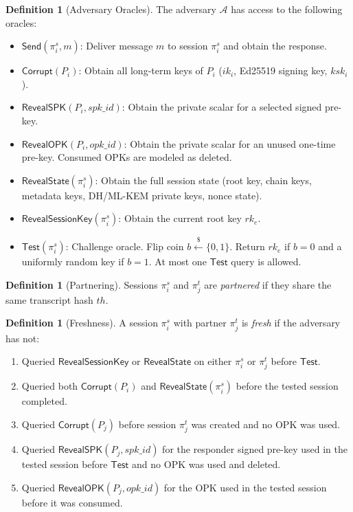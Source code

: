 \documentclass[preprint,12pt]{elsarticle}
\theoremstyle{definition}
\newtheorem{definition}[theorem]{Definition}
\newcommand{\advA}{\mathcal{A}}
\newcommand{\getsr}{\stackrel{\$}{\gets}}
\newcommand{\rk}{\mathit{rk}}
\begin{document}
\begin{definition}[Adversary Oracles]\label{def:oracles}
The adversary $\advA$ has access to the following oracles:
\begin{itemize}
  \item $\textsf{Send}(\pi_i^s, m)$: Deliver message $m$ to session $\pi_i^s$ and obtain the response.
  \item $\textsf{Corrupt}(P_i)$: Obtain all long-term keys of $P_i$ ($\mathit{ik}_i$, Ed25519 signing key, $ksk_i$).
  \item $\textsf{RevealSPK}(P_i,\mathit{spk\_id})$: Obtain the private scalar for a selected signed pre-key.
  \item $\textsf{RevealOPK}(P_i,\mathit{opk\_id})$: Obtain the private scalar for an unused one-time pre-key. Consumed OPKs are modeled as deleted.
  \item $\textsf{RevealState}(\pi_i^s)$: Obtain the full session state (root key, chain keys, metadata keys, DH/ML-KEM private keys, nonce state).
  \item $\textsf{RevealSessionKey}(\pi_i^s)$: Obtain the current root key $\rk_e$.
  \item $\textsf{Test}(\pi_i^s)$: Challenge oracle. Flip coin $b \getsr \{0,1\}$. Return $\rk_e$ if $b = 0$ and a uniformly random key if $b = 1$. At most one $\textsf{Test}$ query is allowed.
\end{itemize}
\end{definition}

\begin{definition}[Partnering]
Sessions $\pi_i^s$ and $\pi_j^t$ are \emph{partnered} if they share the same transcript hash $\mathit{th}$.
\end{definition}

\begin{definition}[Freshness]\label{def:freshness}
A session $\pi_i^s$ with partner $\pi_j^t$ is \emph{fresh} if the adversary has not:
\begin{enumerate}
  \item Queried $\textsf{RevealSessionKey}$ or $\textsf{RevealState}$ on either $\pi_i^s$ or $\pi_j^t$ before $\textsf{Test}$.
  \item Queried both $\textsf{Corrupt}(P_i)$ and $\textsf{RevealState}(\pi_i^s)$ before the tested session completed.
  \item Queried $\textsf{Corrupt}(P_j)$ before session $\pi_j^t$ was created and no OPK was used.
  \item Queried $\textsf{RevealSPK}(P_j,\mathit{spk\_id})$ for the responder signed pre-key used in the tested session before $\textsf{Test}$ and no OPK was used and deleted.
  \item Queried $\textsf{RevealOPK}(P_j,\mathit{opk\_id})$ for the OPK used in the tested session before it was consumed.
\end{enumerate}
\end{definition}
\end{document}
